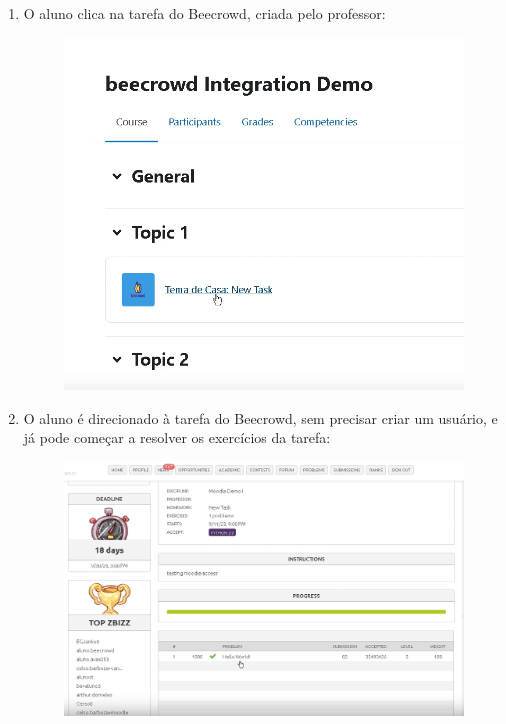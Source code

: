 \begin{enumerate}
    \item O aluno clica na tarefa do Beecrowd, criada pelo professor:

    \begin{figure}[H]
        \centering
            \includegraphics[scale=0.425]{pictures/apendices/apendice_b_18.png}
    \end{figure}

    \item O aluno é direcionado à tarefa do Beecrowd, sem precisar criar um usuário, e já pode começar a resolver os exercícios da tarefa:

    \begin{figure}[H]
        \centering
            \includegraphics[scale=0.5]{pictures/apendices/apendice_b_19.png}
    \end{figure}


\end{enumerate}
